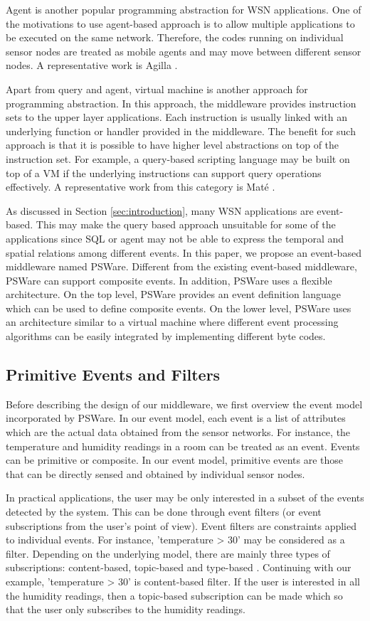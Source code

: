 Agent is another popular programming abstraction for WSN applications. One of the motivations to use agent-based approach is to allow multiple applications to be executed on the same network. Therefore, the codes running on individual sensor nodes are treated as mobile agents and may move between different sensor nodes. A representative work is Agilla \cite{agilla}.

Apart from query and agent, virtual machine is another approach for programming abstraction. In this approach, the middleware provides instruction sets to the upper layer applications. Each instruction is usually linked with an underlying function or handler provided in the middleware. The benefit for such approach is that it is possible to have higher level abstractions on top of the instruction set. For example, a query-based scripting language may be built on top of a VM if the underlying instructions can support query operations effectively. A representative work from this category is Mat\'{e} \cite{mate}.

As discussed in Section \ref{sec:introduction}, many WSN applications are event-based. This may make the query based approach unsuitable for some of the applications since SQL or agent may not be able to express the temporal and spatial relations among different events. In this paper, we propose an event-based middleware named PSWare. Different from the existing event-based middleware, PSWare can support composite events. In addition, PSWare uses a flexible architecture. On the top level, PSWare provides an event definition language which can be used to define composite events. On the lower level, PSWare uses an architecture similar to a virtual machine where different event processing algorithms can be easily integrated by implementing different byte codes.

\subsection{Primitive Events and Filters}
Before describing the design of our middleware, we first overview the event model incorporated by PSWare. In our event model, each event is a list of attributes which are the actual data obtained from the sensor networks. For instance, the temperature and humidity readings in a room can be treated as an event. Events can be primitive or composite. In our event model, primitive events are those that can be directly sensed and obtained by individual sensor nodes.

In practical applications, the user may be only interested in a subset of the events detected by the system. This can be done through event filters (or event subscriptions from the user's point of view). Event filters are constraints applied to individual events. For instance, 'temperature > 30' may be considered as a filter. Depending on the underlying model, there are mainly three types of subscriptions: content-based, topic-based and type-based \cite{facespubsub}. Continuing with our example, 'temperature > 30' is content-based filter. If the user is interested in all the humidity readings, then a topic-based subscription can be made which so that the user only subscribes to the humidity readings. 

